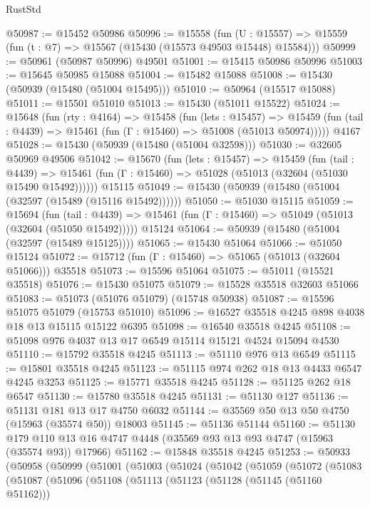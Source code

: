 \begin{lexlean}{RustStd}
\begin{coremodule}
{\begin{coremodule}
{{{{{{{{{{{{{{{{{{{{{{{{{{{{{{{{{{{{{{{{{{{{{{{{{{{{{{{{{{{{@50987 := @15452 @50986
@50996 := @15558
    (fun (U : @15557) => @15559 (fun (t : @7) => @15567 (@15430 (@15573 @49503 @15448) @15584)))
@50999 := @50961 (@50987 @50996) @49501
@51001 := @15415 @50986 @50996
@51003 := @15645 @50985 @15088
@51004 := @15482 @15088
@51008 := @15430 (@50939 (@15480 (@51004 @15495)))
@51010 := @50964 (@15517 @15088)
@51011 := @15501 @51010
@51013 := @15430 (@51011 @15522)
@51024 := @15648
    (fun (rty : @4164) =>
    @15458
      (fun (lets : @15457) =>
      @15459 (fun (tail : @4439) => @15461 (fun (Γ : @15460) => @51008 (@51013 @50974)))))
    @4167
@51028 := @15430 (@50939 (@15480 (@51004 @32598)))
@51030 := @32605 @50969 @49506
@51042 := @15670
    (fun (lets : @15457) =>
    @15459
      (fun (tail : @4439) =>
      @15461 (fun (Γ : @15460) => @51028 (@51013 (@32604 (@51030 @15490 @15492))))))
    @15115
@51049 := @15430 (@50939 (@15480 (@51004 (@32597 (@15489 (@15116 @15492))))))
@51050 := @51030 @15115
@51059 := @15694
    (fun (tail : @4439) => @15461 (fun (Γ : @15460) => @51049 (@51013 (@32604 (@51050 @15492)))))
    @15124
@51064 := @50939 (@15480 (@51004 (@32597 (@15489 @15125))))
@51065 := @15430 @51064
@51066 := @51050 @15124
@51072 := @15712 (fun (Γ : @15460) => @51065 (@51013 (@32604 @51066))) @35518
@51073 := @15596 @51064
@51075 := @51011 (@15521 @35518)
@51076 := @15430 @51075
@51079 := @15528 @35518 @32603 @51066
@51083 := @51073 (@51076 @51079) (@15748 @50938)
@51087 := @15596 @51075 @51079 (@15753 @51010)
@51096 := @16527 @35518 @4245 @898 @4038 @18 @13 @15115 @15122 @6395
@51098 := @16540 @35518 @4245
@51108 := @51098 @976 @4037 @13 @17 @6549 @15114 @15121 @4524 @15094 @4530
@51110 := @15792 @35518 @4245
@51113 := @51110 @976 @13 @6549
@51115 := @15801 @35518 @4245
@51123 := @51115 @974 @262 @18 @13 @4433 @6547 @4245 @3253
@51125 := @15771 @35518 @4245
@51128 := @51125 @262 @18 @6547
@51130 := @15780 @35518 @4245
@51131 := @51130 @127
@51136 := @51131 @181 @13 @17 @4750 @6032
@51144 := @35569 @50 @13 @50 @4750 (@15963 (@35574 @50)) @18003
@51145 := @51136 @51144
@51160 := @51130
    @179
    @110
    @13
    @16
    @4747
    @4448
    (@35569 @93 @13 @93 @4747 (@15963 (@35574 @93)) @17966)
@51162 := @15848 @35518 @4245
@51253 := @50933
    (@50958
      (@50999
        (@51001
          (@51003
            (@51024
              (@51042
                (@51059
                  (@51072
                    (@51083
                      (@51087
                        (@51096
                          (@51108
                            (@51113
                              (@51123
                                (@51128 (@51145 (@51160 @51162)))
}}}}}}}}}}}}}}}}}}}}}}}}}}}}}}}}}}}}}}}}}}}}}}}}}}}}}}}}}}}}
\end{coremodule}}
\end{coremodule}
\end{lexlean}
